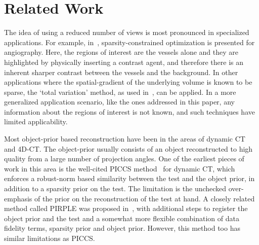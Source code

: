 \documentclass[journal]{IEEEtran}
\begin{document}
 \section{Related Work}
 \label{sec:related}
 The idea of using a reduced number of views is most pronounced in
specialized applications. For example, in~\cite{Essam2015},
sparsity-constrained optimization is presented for angiography. Here,
the regions of interest are the vessels alone and they are highlighted
by physically inserting a contrast agent, and therefore there is an
inherent sharper contrast between the vessels and the background.  In
other applications where the spatial-gradient of the underlying volume
is known to be sparse, the `total variation' method, as used
in~\cite{Li2015,Polak2017}, can be applied.  In a more generalized
application scenario, like the ones addressed in this paper, any
information about the regions of interest is not known, and such
techniques have limited applicability. 


Most object-prior based reconstruction have been in the areas of
dynamic CT and 4D-CT. %
The object-prior usually consists of an object
reconstructed to high quality from a large number of projection
angles. One of the earliest pieces of work in this area is the
well-cited PICCS method~\cite{PICCS} for dynamic CT, which enforces a robust-norm
based similarity between the test and the object prior,
in addition to a sparsity prior on the test. The limitation is the
unchecked over-emphasis of the prior on the reconstruction of the test
at hand. A closely related method called PIRPLE was proposed
in~\cite{pirple}, with additional steps to register the object prior
and the test and a somewhat more flexible combination of data fidelity
terms, sparsity prior and object prior. However, this method too has
similar limitations as PICCS.
\end{document}
